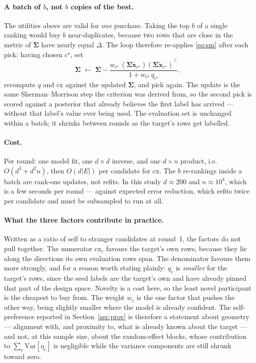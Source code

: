 \documentclass[11pt]{article}
\newcommand{\bx}{\bm{x}}
\newcommand{\bS}{\bm{\Sigma}}
\newcommand{\Var}{\mathrm{Var}}
\begin{document}
\paragraph{A batch of $b$, not $b$ copies of the best.} The utilities above are valid for
\emph{one} purchase. Taking the top $b$ of a single ranking would buy $b$ near-duplicates,
because two rows that are close in the metric of $\bS$ have nearly equal $\Delta$. The loop
therefore re-applies \eqref{eq:sm} after each pick: having chosen $c^\star$, set
\[
  \bS \;\leftarrow\; \bS - \frac{w_{c^\star}\,(\bS\tilde{\bx}_{c^\star})(\bS\tilde{\bx}_{c^\star})^{\!\top}}
                               {1 + w_{c^\star}\,q_{c^\star}},
\]
recompute $q$ and $\mathrm{cx}$ against the updated $\bS$, and pick again. The update is the
same Sherman--Morrison step the criterion was derived from, so the second pick is scored against
a posterior that already believes the first label has arrived --- without that label's value
ever being used. The evaluation set is unchanged within a batch; it shrinks between rounds as
the target's rows get labelled.

\paragraph{Cost.} Per round: one model fit, one $d\times d$ inverse, and one $d\times n$
product, i.e.\ $O(d^3 + d^2 n)$, then $O(d|E|)$ per candidate for $\mathrm{cx}$. The $b$
re-rankings inside a batch are rank-one updates, not refits. In this study $d\approx 200$ and
$n\approx 10^4$, which is a few seconds per round --- against expected error reduction, which
refits twice per candidate and must be subsampled to run at all.

\paragraph{What the three factors contribute in practice.} Written as a ratio of self to
stranger candidates at round~1, the factors do not pull together. The numerator
$\mathrm{cx}_c$ favours the target's own rows, because they lie along the directions its own
evaluation rows span. The denominator favours them more strongly, and for a reason worth
stating plainly: $q_c$ is \emph{smaller} for the target's rows, since the seed labels are the
target's own and have already pinned that part of the design space. Novelty is a cost here, so
the least novel participant is the cheapest to buy from. The weight $w_c$ is the one factor
that pushes the other way, being slightly smaller where the model is already confident. The
self-preference reported in Section~\ref{sec:prov} is therefore a statement about geometry ---
alignment with, and proximity to, what is already known about the target --- and not, at this
sample size, about the random-effect blocks, whose contribution to
$\sum_e\Var[\eta_e]$ is negligible while the variance components are still shrunk toward zero.
\end{document}
